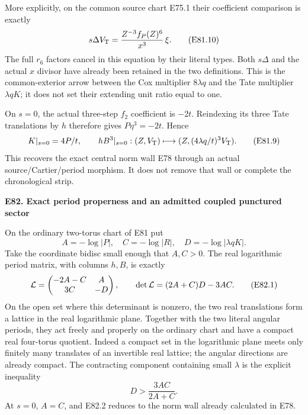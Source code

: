 More explicitly, on the common source chart E75.1 their
coefficient comparison is exactly
\[
       s\Delta V_{\rm T}
          =\frac{Z^{-3}f_P(Z)^6}{x^3}\,\xi .     \tag{E81.10}
\]
The full \(r_6\) factors cancel in this equation by their
literal types. Both \(s\Delta\) and the actual \(x\)
divisor have already been retained in the two definitions.
This is the common-exterior arrow between the Cox multiplier
\(8\lambda q\) and the Tate multiplier \(\lambda qK\);
it does not set their extending unit ratio equal to one.

On \(s=0\), the actual three-step \(f_2\) coefficient is
\(-2t\). Reindexing its three Tate translations by \(h\)
therefore gives \(P\eta^3=-2t\). Hence
\[
 K|_{s=0}=4P/t,\qquad
 hB^3|_{s=0}:(Z,V_{\rm T})\longmapsto
                    (Z,(4\lambda q/t)^3V_{\rm T}).             \tag{E81.9}
\]
This recovers the exact central norm wall E78 through an
actual source/Cartier/period morphism. It does not remove
that wall or complete the chronological strip.

\par

\medskip\noindent\textbf{E82. Exact period properness and an admitted coupled punctured sector}

\par\nobreak

On the ordinary two-torus chart of E81 put
\[
 A=-\log|P|,\quad C=-\log|R|,\quad
 D=-\log|\lambda qK|.
\]
Take the coordinate bidisc small enough that \(A,C>0\).
The real logarithmic period matrix, with columns \(h,B\),
is exactly
\[
 {\cal L}=
 \begin{pmatrix}-2A-C&A\\3C&-D\end{pmatrix},
 \qquad \det{\cal L}=(2A+C)D-3AC.               \tag{E82.1}
\]
On the open set where this determinant is nonzero, the two real
translations form a lattice in the real logarithmic plane. Together with
the two literal angular periods, they act freely and
properly on the ordinary chart and have a compact real
four-torus quotient. Indeed a compact set in the logarithmic
plane meets only finitely many translates of an invertible
real lattice; the angular directions are already compact.
The contracting component containing small \(\lambda\)
is the explicit inequality
\[
                         D>\frac{3AC}{2A+C}.   \tag{E82.2}
\]
At \(s=0\), \(A=C\), and E82.2 reduces to the norm wall
already calculated in E78.

